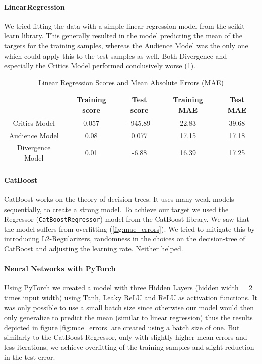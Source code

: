 \documentclass{article}
\begin{document}
    \paragraph{LinearRegression}
    We tried fitting the data with a simple linear regression model from the scikit-learn library. This generally resulted in the model predicting the mean of the targets for the training samples, whereas the Audience Model was the only one which could apply this to the test samples as well. Both Divergence and especially the Critics Model performed conclusively worse (\ref{tab:lin_regression}).
    \begin{table}[h]
        \centering
        \begin{tabular}{c||c|c|c|c}
             & Training score & Test score & Training MAE & Test MAE \\
            \hline
            Critics Model       & 0.057 & -945.89   & 22.83     & 39.68 \\
            \hline
            Audience Model      & 0.08  & 0.077     & 17.15     & 17.18 \\
            \hline
            Divergence Model    & 0.01  & -6.88     & 16.39     & 17.25
        \end{tabular}
        \caption{Linear Regression Scores and Mean Absolute Errors (MAE)}
        \label{tab:lin_regression}
    \end{table}
    \vspace{-8pt}
    \paragraph{CatBoost}
    CatBoost works on the theory of decision trees. It uses many weak models sequentially, to create a strong model. To achieve our target we used the Regressor (\texttt{CatBoostRegressor}) model from the CatBoost library.
    We saw that the model suffers from overfitting (\ref{fig:mae_errors}). We tried to mitigate this by introducing L2-Regularizers, randomness in the choices on the decision-tree of CatBoost and adjusting the learning rate. Neither helped. 
    
    \paragraph{Neural Networks with PyTorch}
    Using PyTorch we created a model with three Hidden Layers (hidden width = 2 times input width) using Tanh, Leaky ReLU and ReLU as activation functions. It was only possible to use a small batch size since otherwise our model would then only generalize to predict the mean (similar to linear regression) thus the results depicted in figure \ref{fig:mae_errors} are created using a batch size of one. But similarly to the CatBoost Regressor, only with slightly higher mean errors and less iterations, we achieve overfitting of the training samples and slight reduction in the test error. 
    
\end{document}
